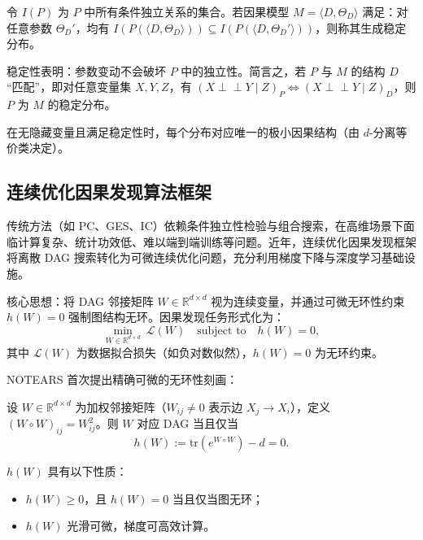 \begin{definition}[稳定性]
	令 $I(P)$ 为 $P$ 中所有条件独立关系的集合。若因果模型 $M = \langle D, \Theta_D \rangle$ 满足：对任意参数 $\Theta_D'$，均有 $I(P(\langle D, \Theta_D \rangle)) \subseteq I(P(\langle D, \Theta_D' \rangle))$，则称其生成稳定分布。
\end{definition}

稳定性表明：参数变动不会破坏 $P$ 中的独立性。简言之，若 $P$ 与 $M$ 的结构 $D$ “匹配”，即对任意变量集 $X,Y,Z$，有 $(X \perp\!\!\!\perp Y \mid Z)_P \Leftrightarrow (X \perp\!\!\!\perp Y \mid Z)_D$，则 $P$ 为 $M$ 的稳定分布。

在无隐藏变量且满足稳定性时，每个分布对应唯一的极小因果结构（由 $d$-分离等价类决定）。

\subsection{连续优化因果发现算法框架}

传统方法（如 PC、GES、IC）依赖条件独立性检验与组合搜索，在高维场景下面临计算复杂、统计功效低、难以端到端训练等问题。近年，连续优化因果发现框架将离散 DAG 搜索转化为可微连续优化问题，充分利用梯度下降与深度学习基础设施。

核心思想：将 DAG 邻接矩阵 $W \in \mathbb{R}^{d \times d}$ 视为连续变量，并通过可微无环性约束 $h(W) = 0$ 强制图结构无环。因果发现任务形式化为：
\begin{equation}
	\min_{W \in \mathbb{R}^{d \times d}} \ \mathcal{L}(W) \quad \text{subject to} \quad h(W) = 0,
	\label{eq:cont_opt_general}
\end{equation}
其中 $\mathcal{L}(W)$ 为数据拟合损失（如负对数似然），$h(W) = 0$ 为无环约束。

NOTEARS\cite{Zheng2018} 首次提出精确可微的无环性刻画：

\begin{theorem}[无环性的矩阵指数刻画]
	设 $W \in \mathbb{R}^{d \times d}$ 为加权邻接矩阵（$W_{ij} \neq 0$ 表示边 $X_j \to X_i$），定义 $(W \circ W)_{ij} = W_{ij}^2$。则 $W$ 对应 DAG 当且仅当
	\begin{equation}
		h(W) := \mathrm{tr}\left(e^{W \circ W}\right) - d = 0.
		\label{eq:h_W}
	\end{equation}
\end{theorem}

$h(W)$ 具有以下性质：
\begin{itemize}
	\item $h(W) \geq 0$，且 $h(W) = 0$ 当且仅当图无环；
	\item $h(W)$ 光滑可微，梯度可高效计算。
\end{itemize}

